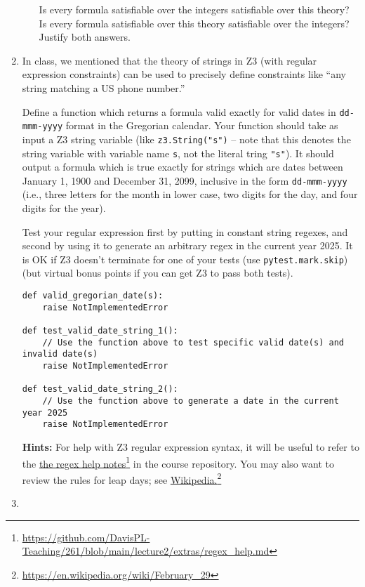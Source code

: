 \documentclass{article}
\newcommand{\visiblehref}[2]{\href{#1}{#2}\footnote{\url{#1}}}
\begin{document}
\begin{enumerate}
\begin{enumerate}[(a)]
Is every formula satisfiable over the integers satisfiable over this theory?
Is every formula satisfiable over this theory satisfiable over the integers?
Justify both answers.
\end{enumerate}

\item
In class, we mentioned that the theory of strings in Z3 (with regular expression constraints)
can be used to precisely define constraints like ``any string matching a US phone number.''

Define a function which returns a formula valid exactly for valid dates in \texttt{dd-mmm-yyyy} format
in the Gregorian calendar.
Your function should take as input a Z3 string variable (like \texttt{z3.String("s")} -- note that this denotes
the string variable with variable name \texttt{s}, not the literal tring \texttt{"s"}).
It should output a formula which is true exactly for strings which are dates
between January 1, 1900 and December 31, 2099, inclusive in the form \texttt{dd-mmm-yyyy}
(i.e., three letters for the month in lower case, two digits for the day, and four digits for the year).

Test your regular expression first by putting in constant string regexes, and second
by using it to generate an arbitrary regex in the current year 2025.
It is OK if Z3 doesn't terminate for one of your tests (use \texttt{pytest.mark.skip})
(but virtual bonus points if you can get Z3 to pass both tests).

\begin{verbatim}
def valid_gregorian_date(s):
    raise NotImplementedError

def test_valid_date_string_1():
    // Use the function above to test specific valid date(s) and invalid date(s)
    raise NotImplementedError

def test_valid_date_string_2():
    // Use the function above to generate a date in the current year 2025
    raise NotImplementedError
\end{verbatim}

\textbf{Hints:}
For help with Z3 regular expression syntax, it will be useful to refer to the \visiblehref{https://github.com/DavisPL-Teaching/261/blob/main/lecture2/extras/regex\_help.md}{the regex help notes} in the course repository.
You may also want to review the rules for leap days; see \visiblehref{https://en.wikipedia.org/wiki/February\_29}{Wikipedia.}

\item



\end{enumerate}
\end{document}
